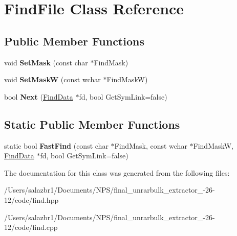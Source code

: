 \hypertarget{class_find_file}{\section{Find\-File Class Reference}
\label{class_find_file}
}
\subsection*{Public Member Functions}
\begin{DoxyCompactItemize}
\item 
\hypertarget{class_find_file_ae4e73fe2efdf1bd7d1d788a050ab473e}{void {\bfseries Set\-Mask} (const char $\ast$Find\-Mask)}\label{class_find_file_ae4e73fe2efdf1bd7d1d788a050ab473e}

\item 
\hypertarget{class_find_file_a60fd077790df2c0b3f299fd64bd7b174}{void {\bfseries Set\-Mask\-W} (const wchar $\ast$Find\-Mask\-W)}\label{class_find_file_a60fd077790df2c0b3f299fd64bd7b174}

\item 
\hypertarget{class_find_file_ad18c9bbc6c1e15950d3fdd2eece060cc}{bool {\bfseries Next} (\hyperlink{struct_find_data}{Find\-Data} $\ast$fd, bool Get\-Sym\-Link=false)}\label{class_find_file_ad18c9bbc6c1e15950d3fdd2eece060cc}

\end{DoxyCompactItemize}
\subsection*{Static Public Member Functions}
\begin{DoxyCompactItemize}
\item 
\hypertarget{class_find_file_a1174d97544c272d4ce5ba92dc1dc5112}{static bool {\bfseries Fast\-Find} (const char $\ast$Find\-Mask, const wchar $\ast$Find\-Mask\-W, \hyperlink{struct_find_data}{Find\-Data} $\ast$fd, bool Get\-Sym\-Link=false)}\label{class_find_file_a1174d97544c272d4ce5ba92dc1dc5112}

\end{DoxyCompactItemize}


The documentation for this class was generated from the following files\-:\begin{DoxyCompactItemize}
\item 
/\-Users/salazbr1/\-Documents/\-N\-P\-S/final\-\_\-unrarbulk\-\_\-extractor\-\_-\/26-\/12/code/find.\-hpp\item 
/\-Users/salazbr1/\-Documents/\-N\-P\-S/final\-\_\-unrarbulk\-\_\-extractor\-\_-\/26-\/12/code/find.\-cpp\end{DoxyCompactItemize}
